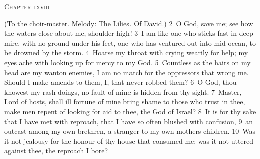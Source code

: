 \documentclass[10pt]{book} %
\begin{document}
\begin{large}\begin{center}\textsc{Chapter lxviii}\end{center}\end{large}
(To the choir-master. Melody: The Lilies. Of David.)
\textcolor{benred8}{2}~O God, save me; see how the waters close about me, shoulder-high! \textcolor{benred8}{3}~I am like one who sticks fast in deep mire, with no ground under his feet, one who has ventured out into mid-ocean, to be drowned by the storm. \textcolor{benred8}{4}~Hoarse my throat with crying wearily for help; my eyes ache with looking up for mercy to my God. \textcolor{benred8}{5}~Countless as the hairs on my head are my wanton enemies, I am no match for the oppressors that wrong me. Should I make amends to them, I, that never robbed them? \textcolor{benred8}{6}~O God, thou knowest my rash doings, no fault of mine is hidden from thy sight. \textcolor{benred8}{7}~Master, Lord of hosts, shall ill fortune of mine bring shame to those who trust in thee, make men repent of looking for aid to thee, the God of Israel? \textcolor{benred8}{8}~It is for thy sake that I have met with reproach, that I have so often blushed with confusion, \textcolor{benred8}{9}~an outcast among my own brethren, a stranger to my own mother\textquotesingle s children. \textcolor{benred8}{10}~Was it not jealousy for the honour of thy house that consumed me; was it not uttered against thee, the reproach I bore?
\end{document}
